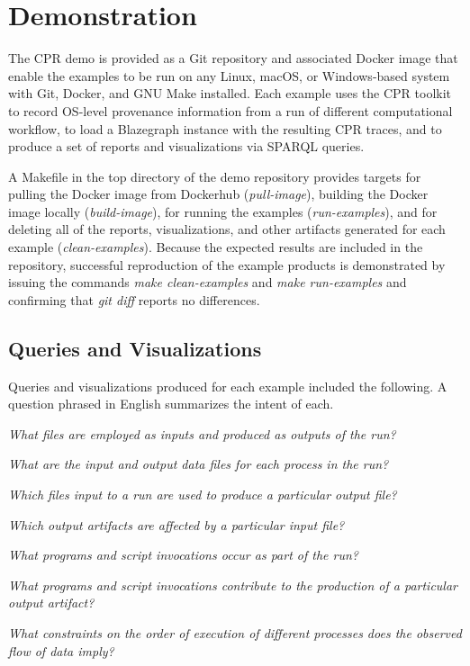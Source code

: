 \section{Demonstration}

The CPR demo is provided as a Git repository and associated Docker image that enable the examples to be run on any Linux, macOS, or Windows-based system with Git, Docker, and GNU Make installed.  Each example uses the CPR toolkit to record OS-level provenance information from a run of different computational workflow, to load a Blazegraph instance with the resulting CPR traces, and to produce a set of reports and visualizations via SPARQL queries.

A Makefile in the top directory of the demo repository provides targets for pulling the Docker image from Dockerhub (\emph{pull-image}), building the Docker image locally (\emph{build-image}), for running the examples (\emph{run-examples}), and for deleting all of the reports, visualizations, and other artifacts generated for each example (\emph{clean-examples}). Because the expected results are included in the repository, successful reproduction of the example products is demonstrated by issuing the commands \emph{make clean-examples} and \emph{make run-examples} and confirming that \emph{git diff} reports no differences.
 
\subsection{Queries and Visualizations}

Queries and visualizations produced for each example included the following. A question phrased in English summarizes the intent of each.

\emph{What files are employed as inputs and produced as outputs of the run?}

\emph{What are the input and output data files for each process in the run?}

\emph{Which files input to a run are used to produce a particular output file?}

\emph{Which output artifacts are affected by a particular input file?}

\emph{What programs and script invocations occur as part of the run?}

\emph{What programs and script invocations contribute to the production of a particular output artifact?}

\emph{What constraints on the order of execution of different processes does the observed flow of data imply?}

